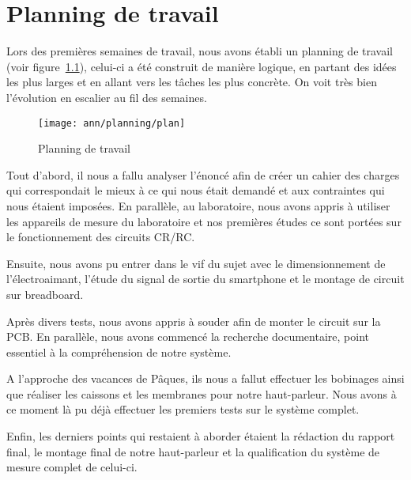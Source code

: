 \chapter{Planning de travail}

Lors des premières semaines de travail, nous avons établi un planning de travail (voir figure~\ref{fig:plan}), celui-ci a été construit de manière logique, en partant des idées les plus larges et en allant vers les tâches les plus concrète. On voit très bien l'évolution en escalier au fil des semaines.

\begin{figure}	
\begin{center}
\texttt{[image: ann/planning/plan]} 
\end{center}
\caption{Planning de travail}		
\label{fig:plan}		
\end{figure}

Tout d'abord, il nous a fallu analyser l'énoncé afin de créer un cahier des charges qui correspondait le mieux à ce qui nous était demandé et aux contraintes qui nous étaient imposées. 
En parallèle, au laboratoire, nous avons appris à utiliser les appareils de mesure du laboratoire et nos premières études ce sont portées sur le fonctionnement des circuits CR/RC.

Ensuite, nous avons pu entrer dans le vif du sujet avec le dimensionnement de l'électroaimant, l'étude du signal de sortie du smartphone et le montage de circuit sur breadboard.

Après divers tests, nous avons appris à souder afin de monter le circuit sur la PCB. En parallèle, nous avons commencé la recherche documentaire, point essentiel à la compréhension de notre système.

A l'approche des vacances de Pâques, ils nous a fallut effectuer les bobinages ainsi que réaliser les caissons et les membranes pour notre haut-parleur. Nous avons à ce moment là pu déjà effectuer les premiers tests sur le système complet.

Enfin, les derniers points qui restaient à aborder étaient la rédaction du rapport final, le montage final de notre haut-parleur et la qualification du système de mesure complet de celui-ci.

